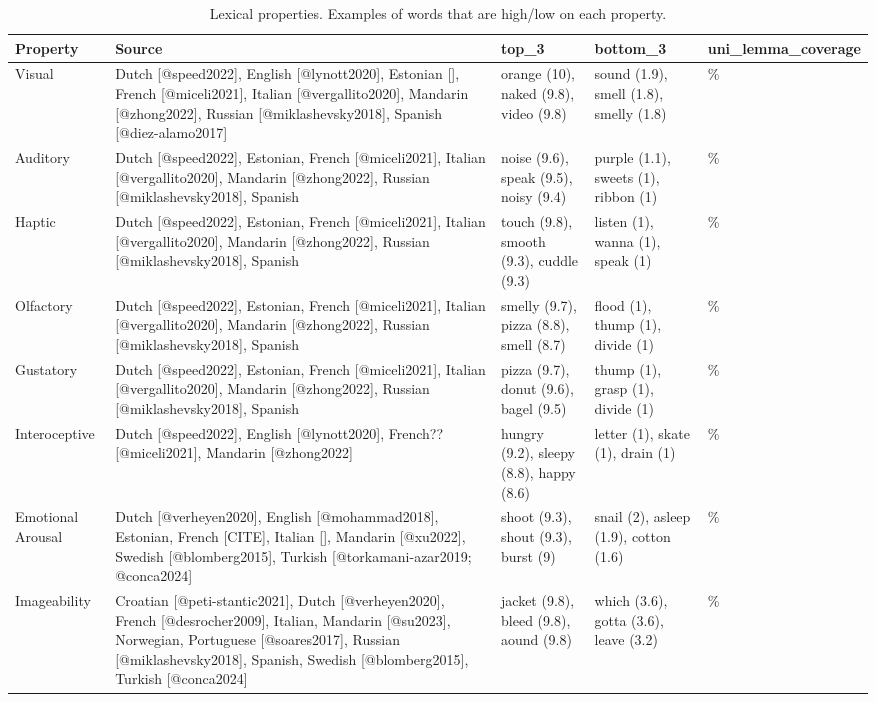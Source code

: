 \documentclass[
  man,floatsintext]{apa6}
\begin{document}
\begin{longtable}[t]{>{\raggedright\arraybackslash}p{1.9cm}|>{\raggedright\arraybackslash}p{7cm}|>{\raggedright\arraybackslash}p{2.25cm}|>{\raggedright\arraybackslash}p{2.25cm}|>{\raggedright\arraybackslash}p{2cm}}
\caption{\label{tab:properties}Lexical properties. Examples of words that are high/low on each property.}\\
\hline
Property & Source & top\_3 & bottom\_3 & uni\_lemma\_coverage\\
\hline
Visual & Dutch [@speed2022], English [@lynott2020], Estonian [], French [@miceli2021], Italian [@vergallito2020], Mandarin [@zhong2022], Russian [@miklashevsky2018], Spanish [@diez-alamo2017] & orange (10), naked (9.8), video (9.8) & sound (1.9), smell (1.8), smelly (1.8) & 97\%\\
\hline
Auditory & Dutch [@speed2022], Estonian, French [@miceli2021], Italian [@vergallito2020], Mandarin [@zhong2022], Russian [@miklashevsky2018], Spanish & noise (9.6), speak (9.5), noisy (9.4) & purple (1.1), sweets (1), ribbon (1) & 96\%\\
\hline
Haptic & Dutch [@speed2022], Estonian, French [@miceli2021], Italian [@vergallito2020], Mandarin [@zhong2022], Russian [@miklashevsky2018], Spanish & touch (9.8), smooth (9.3), cuddle (9.3) & listen (1), wanna (1), speak (1) & 96\%\\
\hline
Olfactory & Dutch [@speed2022], Estonian, French [@miceli2021], Italian [@vergallito2020], Mandarin [@zhong2022], Russian [@miklashevsky2018], Spanish & smelly (9.7), pizza (8.8), smell (8.7) & flood (1), thump (1), divide (1) & 96\%\\
\hline
Gustatory & Dutch [@speed2022], Estonian, French [@miceli2021], Italian [@vergallito2020], Mandarin [@zhong2022], Russian [@miklashevsky2018], Spanish & pizza (9.7), donut (9.6), bagel (9.5) & thump (1), grasp (1), divide (1) & 96\%\\
\hline
Interoceptive & Dutch [@speed2022], English [@lynott2020], French?? [@miceli2021], Mandarin [@zhong2022] & hungry (9.2), sleepy (8.8), happy (8.6) & letter (1), skate (1), drain (1) & 96\%\\
\hline
Emotional Arousal & Dutch [@verheyen2020], English [@mohammad2018], Estonian, French [CITE], Italian [], Mandarin [@xu2022], Swedish [@blomberg2015], Turkish [@torkamani-azar2019; @conca2024] & shoot (9.3), shout (9.3), burst (9) & snail (2), asleep (1.9), cotton (1.6) & 88\%\\
\hline
Imageability & Croatian [@peti-stantic2021], Dutch [@verheyen2020], French [@desrocher2009], Italian, Mandarin [@su2023], Norwegian, Portuguese [@soares2017], Russian [@miklashevsky2018], Spanish, Swedish [@blomberg2015], Turkish [@conca2024] & jacket (9.8), bleed (9.8), aound (9.8) & which (3.6), gotta (3.6), leave (3.2) & 76\%\\

\end{longtable}
\end{document}
